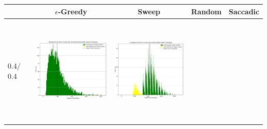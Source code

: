 \begin{landscape}
\begin{table}[h!]
  \centering
  \begin{tabular}{ | m{8mm} | c | c | c | c |}
    \hline
    & $\epsilon$-Greedy & Sweep & Random & Saccadic \\
    \hline
    0.4/ 0.4 &
    \begin{minipage}[c][58mm][c]{48mm}
      \includegraphics[width=48mm, height=52mm]{Chapters/MultiAgentTargetDetection/Figs/Histograms/MiscalibratedSensor/4-4/4-4EpsilonGreedyHistogram.png}
    \end{minipage}
    &
    \begin{minipage}[c][58mm][c]{48mm}
      \includegraphics[width=48mm, height=52mm]{Chapters/MultiAgentTargetDetection/Figs/Histograms/MiscalibratedSensor/4-4/4-4SweepHistogram.png}


\end{minipage}
\end{tabular}
\end{table}
\end{landscape}
